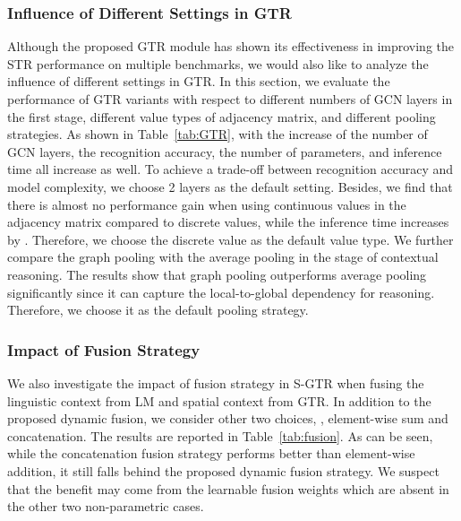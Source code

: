 \documentclass[letterpaper]{article} \usepackage{aaai22}  \usepackage{times}  \usepackage{helvet}  \usepackage{courier}  \usepackage[hyphens]{url}  \usepackage{graphicx} \urlstyle{rm} \def\UrlFont{\rm}  \usepackage{natbib}  \usepackage{caption} \DeclareCaptionStyle{ruled}{labelfont=normalfont,labelsep=colon,strut=off} \frenchspacing  \setlength{\pdfpagewidth}{8.5in}  \setlength{\pdfpageheight}{11in}
\begin{document}
\subsubsection{Influence of Different Settings in GTR}
Although the proposed GTR module has shown its effectiveness in improving the STR performance on multiple benchmarks, we would also like to analyze the influence of different settings in GTR. In this section, we evaluate the performance of GTR variants with respect to different numbers of GCN layers in the first stage, different value types of adjacency matrix, and different pooling strategies. As shown in Table~\ref{tab:GTR}, with the increase of the number of GCN layers, the recognition accuracy, the number of parameters, and inference time all increase as well. To achieve a trade-off between recognition accuracy and model complexity, we choose 2 layers as the default setting. Besides, we find that there is almost no performance gain when using continuous values in the adjacency matrix compared to discrete values, while the inference time increases by . Therefore, we choose the discrete value as the default value type. We further compare the graph pooling with the average pooling in the stage of contextual reasoning. The results show that graph pooling outperforms average pooling significantly since it can capture the local-to-global dependency for reasoning. Therefore, we choose it as the default pooling strategy.


\begin{table}
\caption{Empirical study of the fusion strategy in S-GTR. ``Add'': element-wise addition. ``Concat'': Concatenation. ``D-fuse'': Dynamic fusion.}
\label{tab:fusion}
\end{table}


\subsubsection{Impact of Fusion Strategy}
We also investigate the impact of fusion strategy in S-GTR when fusing the linguistic context from LM and spatial context from GTR. In addition to the proposed dynamic fusion, we consider other two choices, , element-wise sum and concatenation. The results are reported in Table~\ref{tab:fusion}. As can be seen, while the concatenation fusion strategy performs better than element-wise addition, it still falls behind the proposed dynamic fusion strategy. We suspect that the benefit may come from the learnable fusion weights which are absent in the other two non-parametric cases.
\end{document}
